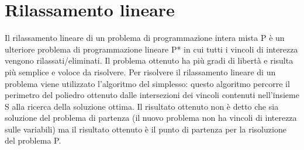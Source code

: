 \documentclass[12pt,a4paper,twoside,openright]{book}
\begin{document}
\section{Rilassamento lineare}
Il rilassamento lineare di un problema di programmazione intera mista P è un ulteriore problema di programmazione lineare P* in cui
tutti i vincoli di interezza vengono rilassati/eliminati. Il problema ottenuto ha più gradi di libertà
e risulta più semplice e voloce da risolvere. Per risolvere il rilassamento lineare di un problema viene 
utilizzato l'algoritmo del simplesso: questo algoritmo percorre il perimetro del poliedro ottenuto dalle intersezioni 
dei vincoli contenuti nell'insieme S alla ricerca della soluzione ottima. Il risultato ottenuto non 
è detto che sia soluzione del problema di partenza (il nuovo problema non ha vincoli di interezza sulle 
variabili) ma il risultato ottenuto è il punto di partenza per la risoluzione del problema P.
    
\end{document}
